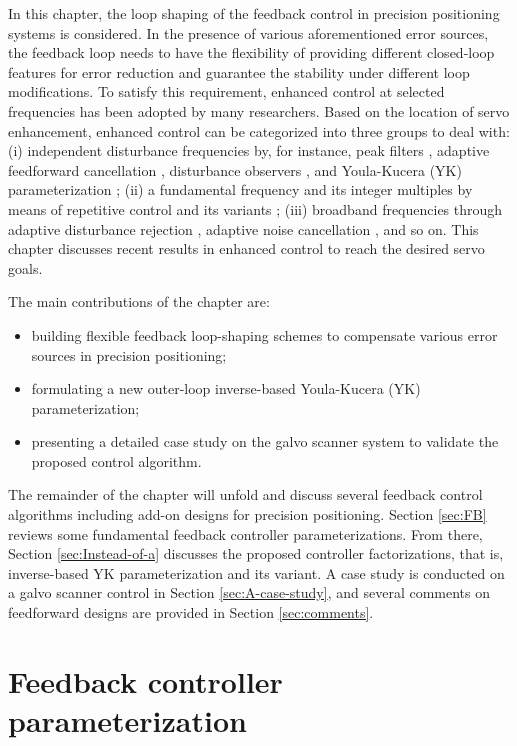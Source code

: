 \documentclass [11pt, proquest] {uwthesis}[2020/02/24]
\begin{document}
In this chapter, the loop shaping of the feedback control in precision
positioning systems is considered. In the presence of various aforementioned
error sources, the feedback loop needs to have the flexibility of
providing different closed-loop features for error reduction and guarantee
the stability under different loop modifications. To satisfy this
requirement, enhanced control at selected frequencies has been adopted
by many researchers. Based on the location of servo enhancement, enhanced
control can be categorized into three groups to deal with: (i) independent
disturbance frequencies by, for instance, peak filters \cite{li2011reset,sievers1992comparison},
adaptive feedforward cancellation \cite{Bodson1997,chen2016multirate},
disturbance observers \cite{XuChen_TCST2012,zheng2017design,chen2013selective},
and Youla-Kucera (YK) parameterization \cite{landau2005adaptive,landau2013benchmark,youla1976modern,kucera1975stability};
(ii) a fundamental frequency and its integer multiples by means of
repetitive control and its variants \cite{chen2014new,steinbuch2007design};
(iii) broadband frequencies through adaptive disturbance rejection
\cite{de2013adaptive}, adaptive noise cancellation \cite{widrow1975adaptive},
and so on. This chapter discusses recent results in enhanced control
to reach the desired servo goals. 

The main contributions of the chapter are:
\begin{itemize}
\item building flexible feedback loop-shaping schemes to compensate various
error sources in precision positioning;
\item formulating a new outer-loop inverse-based Youla-Kucera (YK) parameterization;
\item presenting a detailed case study on the galvo scanner system to validate
the proposed control algorithm.
\end{itemize}
The remainder of the chapter will unfold and discuss several feedback
control algorithms including add-on designs for precision positioning.
Section \ref{sec:FB} reviews some fundamental feedback controller
parameterizations. From there, Section \ref{sec:Instead-of-a} discusses
the proposed controller factorizations, that is, inverse-based YK
parameterization and its variant. A case study is conducted on a galvo
scanner control in Section \ref{sec:A-case-study}, and several comments
on feedforward designs are provided in Section \ref{sec:comments}.

\section{Feedback controller parameterization}
\end{document}
